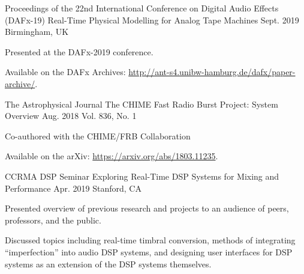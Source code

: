 

\begin{cventries}

  \cventry
    {Proceedings of the 22nd International Conference on Digital Audio Effects (DAFx-19)} %
    {Real-Time Physical Modelling for Analog Tape Machines} %
    {Sept. 2019} %
    {Birmingham, UK} %
    {
      \begin{cvitems} %
        \item {Presented at the DAFx-2019 conference.}
        \item {Available on the DAFx Archives: \url{http://ant-s4.unibw-hamburg.de/dafx/paper-archive/}.}
      \end{cvitems}
    }

    \cventry
    {The Astrophysical Journal} %
    {The CHIME Fast Radio Burst Project: System Overview} %
    {Aug. 2018} %
    {Vol. 836, No. 1} %
    {
      \begin{cvitems} %
        \item {Co-authored with the CHIME/FRB Collaboration}
        \item {Available on the arXiv: \url{https://arxiv.org/abs/1803.11235}.}
      \end{cvitems}
    }

    \cventry
    {CCRMA DSP Seminar} %
    {Exploring Real-Time DSP Systems for Mixing and Performance} %
    {Apr. 2019} %
    {Stanford, CA} %
    {
      \begin{cvitems} %
        \item {Presented overview of previous research and projects to an audience of peers, professors, and the public.}
        \item {Discussed topics including real-time timbral conversion, methods of integrating ``imperfection'' into audio
               DSP systems, and designing user interfaces for DSP systems as an extension of the DSP systems themselves.}
      \end{cvitems}
    }


\end{cventries}
